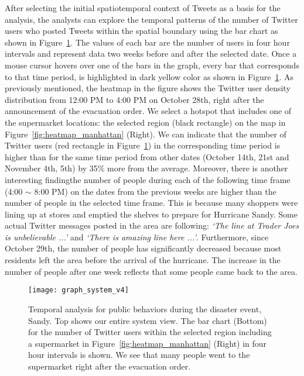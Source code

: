 After selecting the initial spatiotemporal context of Tweets as a basis for the analysis, the analysts can explore the temporal patterns of the number of Twitter users who posted Tweets within the spatial boundary using the bar chart as shown in Figure~\ref{fig:graph}.
The values of each bar are the number of users in four hour intervals and represent data two weeks before and after the selected date.
Once a mouse cursor hovers over one of the bars in the graph, every bar that corresponds to that time period, is highlighted in dark yellow color as shown in Figure~\ref{fig:graph}.
As previously mentioned, the heatmap in the figure shows the Twitter user density distribution from 12:00 PM to 4:00 PM on October 28th, right after the announcement of the evacuation order.
We select a hotspot that includes one of the supermarket locations: the selected region (black rectangle) on the map in Figure~\ref{fig:heatmap_manhattan} (Right).
We can indicate that the number of Twitter users (red rectangle in Figure~\ref{fig:graph}) in the corresponding time period is higher than for the same time period from other dates (October 14th, 21st and November 4th, 5th) by 35\% more from the average.
Moreover, there is another interesting finding\textemdash the number of people during each of the following time frame (4:00 $\sim$ 8:00 PM) on the dates from the previous weeks are higher than the number of people in the selected time frame.
This is because many shoppers were lining up at stores and emptied the shelves to prepare for Hurricane Sandy.
Some actual Twitter messages posted in the area are following: \textit{\textquoteleft The line at Trader Joes is unbelievable ...\textquoteright} and \textit{\textquoteleft There is amazing line here ...\textquoteright}.
Furthermore, since October 29th, the number of people has significantly decreased because most residents left the area before the arrival of the hurricane.
The increase in the number of people after one week reflects that some people came back to the area.


\begin{figure}[tbh]
\centering
\texttt{[image: graph\_system\_v4]}
\caption{Temporal analysis for public behaviors during the disaster event, Sandy. Top shows our entire system view. 
The bar chart (Bottom) for the number of Twitter users within the selected region including a supermarket in Figure~\ref{fig:heatmap_manhattan} (Right) in four hour intervals is shown.
We see that many people went to the supermarket right after the evacuation order.}
\label{fig:graph}
\end{figure}




